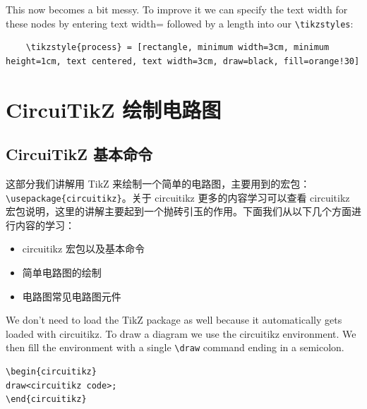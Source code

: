 \documentclass[cn,11pt, simple]{elegantbook}
\begin{document}

This now becomes a bit messy. To improve it we can specify the text width for these nodes by entering text width= followed by a length into our \verb|\tikzstyles|:

\begin{lstlisting}
	\tikzstyle{process} = [rectangle, minimum width=3cm, minimum height=1cm, text centered, text width=3cm, draw=black, fill=orange!30]
\end{lstlisting}
		



\chapter{CircuiTikZ 绘制电路图}

\section{CircuiTikZ 基本命令}
这部分我们讲解用  TikZ 来绘制一个简单的电路图，主要用到的宏包： \verb|\usepackage{circuitikz}|。关于 circuitikz 更多的内容学习可以查看 circuitikz 宏包说明，这里的讲解主要起到一个抛砖引玉的作用。下面我们从以下几个方面进行内容的学习：
\begin{itemize}
  \item circuitikz 宏包以及基本命令
  \item 简单电路图的绘制
  \item 电路图常见电路图元件
\end{itemize}


\begin{tcolorbox}
	We don't need to load the TikZ package as well because it automatically gets loaded with circuitikz. To draw a diagram we use the circuitikz environment. We then fill the environment with a single \verb|\draw| command ending in a semicolon.
\end{tcolorbox}

\begin{lstlisting}
\begin{circuitikz}
draw<circuitikz code>;
\end{circuitikz}
\end{lstlisting}
\end{document}
